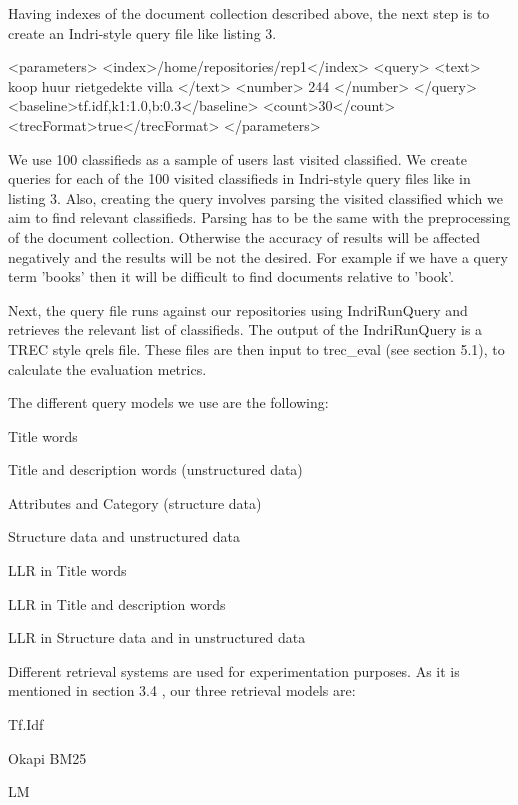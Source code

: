 Having indexes of the document collection described above, the next step is to create an Indri-style query file like listing 3.

\begin{code}[caption={Query parameter file}]
<parameters>
 <index>/home/repositories/rep1</index>
  <query>
 	<text> koop huur rietgedekte villa </text>
	<number> 244 </number>
  </query>
  <baseline>tf.idf,k1:1.0,b:0.3</baseline>
  <count>30</count>
  <trecFormat>true</trecFormat>
</parameters>
\end{code}

We use 100 classifieds as a sample of users last visited classified. We create queries for each of the 100 visited classifieds in Indri-style query files like in listing 3. Also, creating the query involves parsing the visited classified which we aim to find relevant classifieds. Parsing has to be the same with the preprocessing of the document collection. Otherwise the accuracy of results will be affected negatively and the results will be not the desired. For example if we have a query term 'books' then it will be difficult to find documents relative to 'book'.

Next, the query file runs against our repositories using IndriRunQuery and retrieves the relevant list of classifieds. The output of the IndriRunQuery is a TREC style qrels file. These files are then input to trec\_eval (see section 5.1), to calculate the evaluation metrics.



The different query models we use are the following:

\begin{list}{.}{}
\item{Title words}
\item{Title and description words (unstructured data)}
\item{Attributes and Category (structure data)}
\item{Structure data and unstructured data}
\item{LLR in Title words}
\item{LLR in Title and description words}
\item{LLR in Structure data and in unstructured data}
\end{list}


Different retrieval systems are used for experimentation purposes. As it is mentioned in section 3.4 , our three retrieval models are:
\begin{list}{.}{}
\item{Tf.Idf}
\item{Okapi BM25}
\item{LM}
\end{list}

